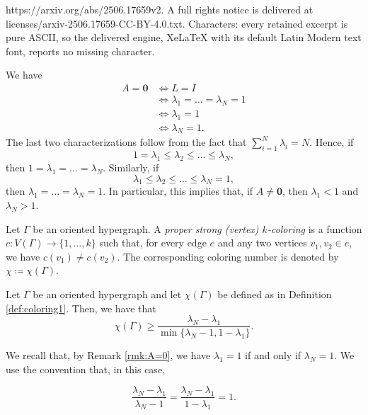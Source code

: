 \documentclass[10pt,a4paper]{amsart}
\begin{document}
https://arxiv.org/abs/2506.17659v2. A full rights notice is delivered at licenses/arxiv-2506.17659-CC-BY-4.0.txt. Characters: every retained excerpt is pure ASCII, so the delivered engine, XeLaTeX with its default Latin Modern text font, reports no missing character.
\begin{remark}\label{rmk:A=0}
We have 
\begin{align*}
    A=\textbf{0} &\iff L=I \\
    &\iff \lambda_1=\ldots=\lambda_N=1\\
    &\iff \lambda_1=1\\
    &\iff \lambda_N=1.
\end{align*}
The last two characterizations follow from the fact that $\sum_{i=1}^N\lambda_i=N$. Hence, if $$1=\lambda_1\leq \lambda_2\leq \ldots\leq\lambda_N,$$ then $1=\lambda_1= \ldots=\lambda_N$. Similarly, if $$\lambda_1\leq \lambda_2\leq \ldots\leq\lambda_N=1,$$ then $\lambda_1= \ldots=\lambda_N=1$. In particular, this implies that, if $A\neq \textbf{0}$, then $\lambda_1<1$ and $\lambda_N>1$.
\end{remark}

\begin{definition}\label{def:coloring1}
    Let $\Gamma$ be an oriented hypergraph. A \emph{proper strong (vertex) $k$-coloring} is a function $c\colon V(\Gamma)\to \{1,\ldots,k\}$ such that, for every edge $e$ and any two vertices $v_1,v_2\in e$, we have $c(v_1)\neq c(v_2)$. The corresponding coloring number is denoted by $\chi\coloneqq \chi(\Gamma)$.
\end{definition}

\begin{theorem}\label{thm:cor5.4AMZ}
    Let $\Gamma$ be an oriented hypergraph and let $\chi(\Gamma)$ be defined as in Definition \ref{def:coloring1}. Then, we have that
    \[
    \chi(\Gamma) \geq \frac{\lambda_N - \lambda_1}{\min\bigl\{ \lambda_N-1, 1-\lambda_1 \bigr\}}.
    \]
\end{theorem}

\begin{convention}\label{conv:1}
We recall that, by Remark \ref{rmk:A=0}, we have $\lambda_1=1$ if and only if $\lambda_N=1$. We use the convention that, in this case, 

\[
\frac{\lambda_N-\lambda_1}{\lambda_N-1} = \frac{\lambda_N-\lambda_1}{1-\lambda_1} = 1.
\]
\end{convention}
\end{document}
